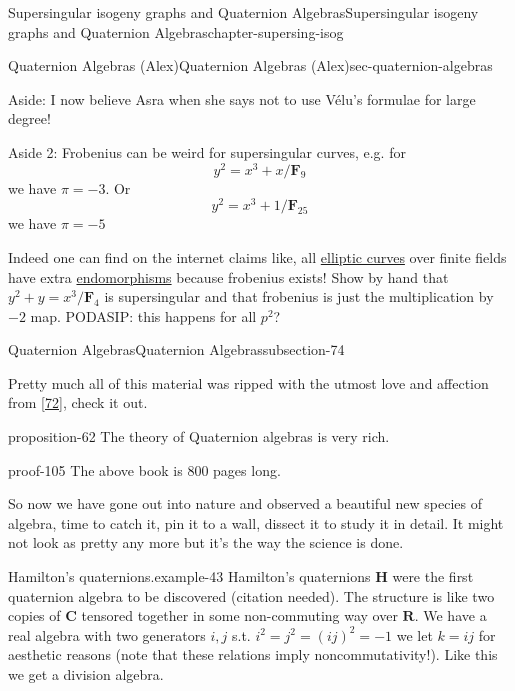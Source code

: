 \documentclass[oneside,10pt,]{book}
\numberwithin{equation}{section}
\newcommand{\RR}{\mathbf{R}}
\newcommand{\CC}{\mathbf{C}}
\newcommand{\HH}{\mathbf{H}}
\newcommand{\FF}{\mathbf{F}}
\begin{document}
\begin{chapterptx}{Supersingular isogeny graphs and Quaternion Algebras}{}{Supersingular isogeny graphs and Quaternion Algebras}{}{}{chapter-supersing-isog}
\begin{sectionptx}{Quaternion Algebras (Alex)}{}{Quaternion Algebras (Alex)}{}{}{sec-quaternion-algebras}
\begin{introduction}{}
\hypertarget{p-878}{}%
Aside: I now believe Asra when she says not to use Vélu's formulae for large degree!%
\par
\hypertarget{p-879}{}%
Aside 2: Frobenius can be weird for supersingular curves, e.g. for%
\begin{equation*}
y^2 = x^{3} + x/\FF_9
\end{equation*}
we have \(\pi = -3\). Or%
\begin{equation*}
y^2 = x^{3} + 1/\FF_{25}
\end{equation*}
we have \(\pi = -5\)%
\par
\hypertarget{p-880}{}%
Indeed one can find on the internet claims like, all \hyperref[def-supersing-isog-ec]{elliptic curves} over finite fields have extra \hyperref[def-supersing-isog-endo]{endomorphisms} because frobenius exists!%
\hypertarget{p-881}{}%
Show by hand that \(y^2 + y = x^3/\FF_4\) is supersingular and that frobenius is just the multiplication by \(-2\) map.%
\hypertarget{p-882}{}%
PODASIP: this happens for all \(p^2\)?%
\end{introduction}%
%
%
\typeout{************************************************}
\typeout{************************************************}
%
\begin{subsectionptx}{Quaternion Algebras}{}{Quaternion Algebras}{}{}{subsection-74}
\begin{introduction}{}%
\hypertarget{p-883}{}%
Pretty much all of this material was ripped with the utmost love and affection from \hyperlink{bib-voight-quat}{[72]}, check it out.%
\begin{proposition}{}{}{proposition-62}%
\hypertarget{p-884}{}%
The theory of Quaternion algebras is very rich.%
\end{proposition}
\begin{proofptx}{}{proof-105}
\hypertarget{p-885}{}%
The above book is 800 pages long.%
\end{proofptx}
\hypertarget{p-886}{}%
So now we have gone out into nature and observed a beautiful new species of algebra, time to catch it, pin it to a wall, dissect it to study it in detail. It might not look as pretty any more but it's the way the science is done.%
\begin{example}{Hamilton's quaternions.}{example-43}%
\hypertarget{p-887}{}%
Hamilton's quaternions \(\HH\) were the first quaternion algebra to be discovered (citation needed). The structure is like two copies of \(\CC\) tensored together in some non-commuting way over \(\RR\). We have a real algebra with two generators \(i,j\) s.t. \(i^2 = j^2  = (ij)^2 = -1\) we let \(k = ij\) for aesthetic reasons (note that these relations imply noncommutativity!). Like this we get a division algebra.%

\end{example}
\end{introduction}
\end{subsectionptx}
\end{sectionptx}
\end{chapterptx}
\end{document}
